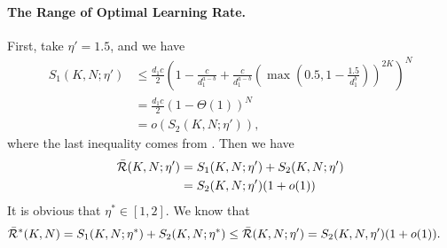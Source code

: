 \paragraph{The Range of Optimal Learning Rate.}
First, take $\eta' = 1.5$, and we have
    \begin{align*}
        S_1(K, N; \eta') &\leq \frac{d_1c}{2}\left(1-\frac{c}{d_1^{a-b}}+\frac{c}{d_1^{a-b}}\left(\max\left(0.5, 1-\frac{1.5}{d_1^{b}}\right)\right)^{2K}\right)^N \\
        &=\frac{d_1c}{2}\left(1-\Theta(1)\right)^N \\
        &=o(S_2(K, N;\eta')),
    \end{align*}
    where the last inequality comes from . Then we have
    \begin{align*}
        \Bar{\mathcal{R}}(K, N;\eta')&=S_1(K, N;\eta')+S_2(K, N;\eta') \\
        &=S_2(K, N;\eta')(1+o(1)) 
    \end{align*}
    It is obvious that $\eta^* \in [1, 2]$. We know that
    \begin{align*}
        \Bar{\mathcal{R}}^*(K, N)&=S_1(K, N;\eta^*)+S_2(K, N;\eta^*) \leq\Bar{\mathcal{R}}(K, N;\eta')=S_2(K, N, \eta')(1+o(1)).
    \end{align*}
    




